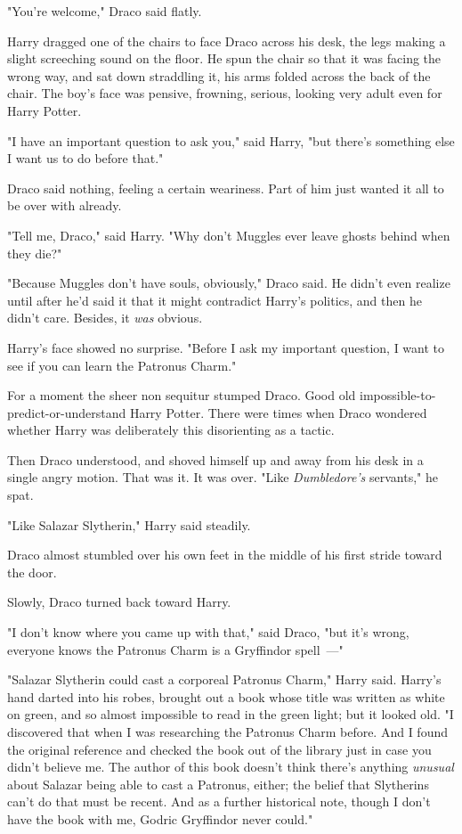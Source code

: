 "You're welcome," Draco said flatly.

Harry dragged one of the chairs to face Draco across his desk, the legs making
a slight screeching sound on the floor. He spun the chair so that it was facing
the wrong way, and sat down straddling it, his arms folded across the back of
the chair. The boy's face was pensive, frowning, serious, looking very adult
even for Harry Potter.

"I have an important question to ask you," said Harry, "but there's something
else I want us to do before that."

Draco said nothing, feeling a certain weariness. Part of him just wanted it all
to be over with already.

"Tell me, Draco," said Harry. "Why don't Muggles ever leave ghosts behind when
they die?"

"Because Muggles don't have souls, obviously," Draco said. He didn't even
realize until after he'd said it that it might contradict Harry's politics, and
then he didn't care. Besides, it \emph{was} obvious.

Harry's face showed no surprise. "Before I ask my important question, I want to
see if you can learn the Patronus Charm."

For a moment the sheer non sequitur stumped Draco. Good old
impossible-to-predict-or-understand Harry Potter. There were times when Draco
wondered whether Harry was deliberately this disorienting as a tactic.

Then Draco understood, and shoved himself up and away from his desk in a single
angry motion. That was it. It was over. "Like \emph{Dumbledore's} servants," he
spat.

"Like Salazar Slytherin," Harry said steadily.

Draco almost stumbled over his own feet in the middle of his first stride
toward the door.

Slowly, Draco turned back toward Harry.

"I don't know where you came up with that," said Draco, "but it's wrong,
everyone knows the Patronus Charm is a Gryffindor spell~---"

"Salazar Slytherin could cast a corporeal Patronus Charm," Harry said. Harry's
hand darted into his robes, brought out a book whose title was written as white
on green, and so almost impossible to read in the green light; but it looked
old. "I discovered that when I was researching the Patronus Charm before. And I
found the original reference and checked the book out of the library just in
case you didn't believe me. The author of this book doesn't think there's
anything \emph{unusual} about Salazar being able to cast a Patronus, either;
the belief that Slytherins can't do that must be recent. And as a further
historical note, though I don't have the book with me, Godric Gryffindor never
could."

